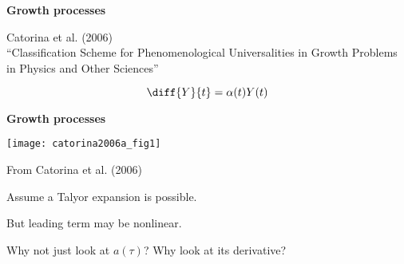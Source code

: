    
  \textbf{Growth processes}

  
   
    Catorina et al. (2006)\cite{catorina2006a}\\
    ``Classification Scheme for Phenomenological Universalities
    in Growth Problems in Physics and Other Sciences''
  
    $$
    \diff{Y}{t}
    =
    \alpha(t)
    Y(t)
    $$
  


  \textbf{Growth processes}

  \texttt{[image: catorina2006a\_fig1]}

  \tiny{From Catorina et al. (2006)\cite{catorina2006a}}

  Assume a Talyor expansion is possible.

  But leading term may be nonlinear.

  Why not just look at $a(\tau)$?
  Why look at its derivative?
